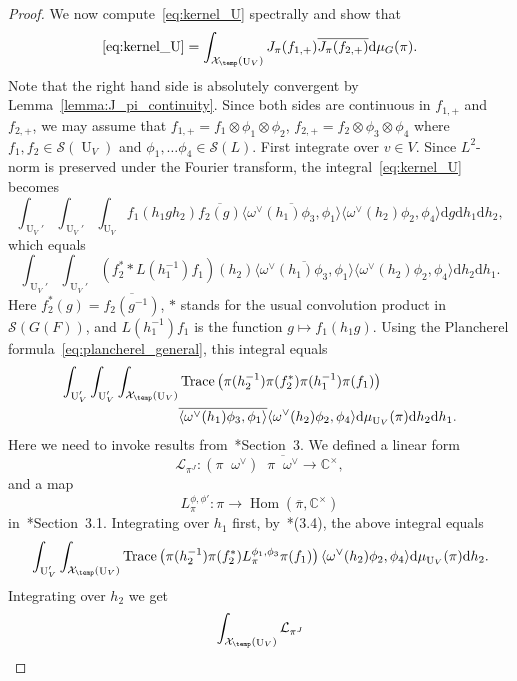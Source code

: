 \documentclass[letterpaper,11pt]{amsart}
\newcommand{\C}{\mathbb{C}}
\newcommand{\cL}{\mathcal{L}}
\newcommand{\cS}{\mathcal{S}}
\newcommand{\cX}{\mathcal{X}}
\newcommand{\rd}{\mathrm{d}}
\newcommand{\<}{\negthickspace}
\DeclareMathOperator{\Trace}{Trace}
\DeclareMathOperator{\U}{U}
\DeclareMathOperator{\Hom}{Hom}
\DeclareMathOperator{\otimeshat}{\widehat{\otimes}}
\theoremstyle{definition}
\theoremstyle{plain}
\theoremstyle{remark}
\numberwithin{equation}{section}
\begin{document}
\begin{proof}
We now compute~\eqref{eq:kernel_U} spectrally and show that
    \[
    \eqref{eq:kernel_U} = \int_{\cX_{\temp}(\U_V)} J_{\pi}(f_{1, +})
    \overline{J_{\pi}(f_{2, +})} \rd \mu_G(\pi).
    \]
Note that the right hand side is absolutely convergent by Lemma~\ref{lemma:J_pi_continuity}.
Since both sides are continuous in $f_{1, +}$ and $f_{2, +}$, we may assume
that $f_{1, +} = f_1 \otimes \phi_1 \otimes \phi_2$, $f_{2, +} = f_2 \otimes
\phi_3 \otimes \phi_4$ where $f_1, f_2 \in \cS(\U_V)$ and $\phi_1, \hdots
\phi_4 \in \cS(L)$. First integrate over $v \in V$. Since $L^2$-norm is
preserved under the Fourier transform, the integral~\eqref{eq:kernel_U}
becomes
    \[
    \int_{\U_V'} \int_{\U_V'} \int_{\U_V}
    f_1(h_1g h_2) \overline{f_2(g)}
    \overline{\langle \omega^\vee(h_1) \phi_3, \phi_1 \rangle}
    \langle \omega^\vee(h_2) \phi_2, \phi_4 \rangle
    \rd g \rd h_1 \rd h_2,
    \]
which equals
    \[
    \int_{\U_V'} \int_{\U_V'}
    \left( f_2^* * L(h_1^{-1}) f_1 \right)(h_2)
    \overline{\langle \omega^\vee(h_1) \phi_3, \phi_1 \rangle}
    \langle \omega^\vee(h_2) \phi_2, \phi_4 \rangle
    \rd h_2 \rd h_1.
    \]
Here $f_2^*(g) = \overline{f_2(g^{-1})}$, $*$ stands for the usual
convolution product in $\cS(G(F))$, and $L(h_1^{-1}) f_1$ is the function $g \mapsto f_1(h_1 g)$. Using the Plancherel
formula~\eqref{eq:plancherel_general}, this integral equals
    \[
    \begin{aligned}
    \int_{\U_V'} \int_{\U_V'} \int_{\cX_{\temp}(\U_V)}
    &\Trace \left( \pi(h_2^{-1}) \pi( f_2^*) \pi(h_1^{-1}) \pi(f_1) \right)\\
    &\overline{ \langle \omega^\vee(h_1) \phi_3, \phi_1 \rangle}
    \langle \omega^\vee(h_2) \phi_2, \phi_4 \rangle
    \rd \mu_{\U_V}(\pi)\rd h_2 \rd h_1.
    \end{aligned}
    \]
Here we need to invoke results from~\cite{Xue6}*{Section~3}. We defined a linear form
    \[
    \cL_{\pi^J}: (\pi \otimeshat \omega^\vee) \otimeshat
    \overline{\pi \otimeshat \omega^\vee} \to \C^\times,
    \]
and a map
    \[
    L_{\pi}^{\phi, \phi'}: \pi \to \Hom(\overline{\pi},  \C^\times)
    \]
in~\cite{Xue6}*{Section~3.1}. Integrating over $h_1$ first,
by~\cite{Xue6}*{(3.4)}, the above integral equals
    \[
    \int_{\U_V'} \int_{\cX_{\temp}(\U_V)}
    \Trace \left( \pi(h_2^{-1}) \pi( f_2^*) L_{\pi}^{\phi_1, \phi_3} \pi(f_1) \right)\\
    \langle \omega^\vee(h_2) \phi_2, \phi_4 \rangle
    \rd \mu_{\U_V}(\pi)\rd h_2.
    \]
Integrating over $h_2$ we get
    \[
    \int_{\cX_{\temp}(\U_V)} \cL_{\pi^J}
\]
\end{proof}
\end{document}
